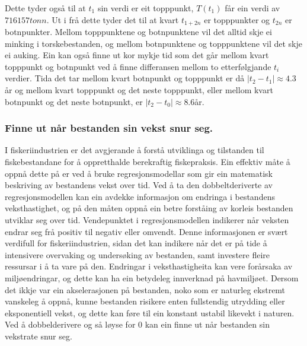 \documentclass{report}
\begin{document}
Dette tyder også til at $t_1$ sin verdi er eit topppunkt, $T(t_1)$ får ein verdi av $716157tonn$.
Ut i frå dette tyder det til at kvart $t_{1+2n}$ er topppunkter og $t_{2n}$ er botnpunkter. Mellom topppunktene og botnpunktene vil det alltid skje ei minking i torskebestanden, og mellom botnpunktene og topppunktene vil det skje ei auking.
Ein kan også finne ut kor mykje tid som det går mellom kvart topppunkt og botnpunkt ved å finne differansen mellom to etterfølgjande $t_i$ verdier.
Tida det tar mellom kvart botnpunkt og topppunkt er då $|t_2 - t_1| \approx 4.3$år og mellom kvart topppunkt og det neste topppunkt, eller mellom kvart botnpunkt og det neste botnpunkt, er $|t_2-t_0| \approx 8.6$år.
\subsubsection{Finne ut når bestanden sin vekst snur seg.}
I fiskeriindustrien er det avgjerande å forstå utviklinga og tilstanden til fiskebestandane for å oppretthalde berekraftig fiskepraksis.
Ein effektiv måte å oppnå dette på er ved å bruke regresjonsmodellar som gir ein matematisk beskriving av bestandens vekst over tid.
Ved å ta den dobbeltderiverte av regresjonsmodellen kan ein avdekke informasjon om endringa i bestandens veksthastighet, og på den måten oppnå ein betre forståing av korleis bestanden utviklar seg over tid.
Vendepunktet i regresjonsmodellen indikerer når veksten endrar seg frå positiv til negativ eller omvendt.
Denne informasjonen er svært verdifull for fiskeriindustrien, sidan det kan indikere når det er på tide å intensivere overvaking og undersøking av bestanden, samt investere fleire ressursar i å ta vare på den.
Endringar i veksthastigheita kan vere forårsaka av miljøendringar, og dette kan ha ein betydeleg innverknad på havmiljøet.
Dersom det ikkje var ein akselerasjonen på bestanden, noko som er naturleg ekstremt vanskeleg å oppnå, kunne bestanden risikere enten fullstendig utrydding eller eksponentiell vekst, og dette kan føre til ein konstant ustabil likevekt i naturen.
Ved å dobbelderivere og så løyse for 0 kan ein finne ut når bestanden sin vekstrate snur seg.
\end{document}
